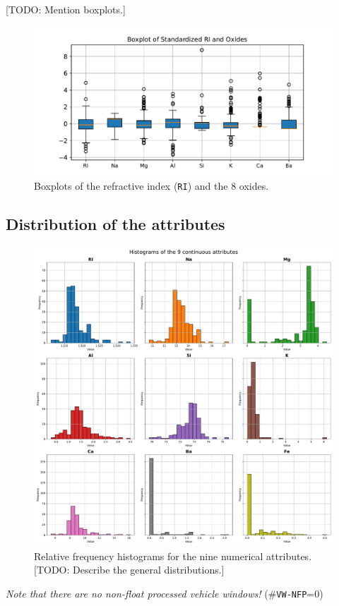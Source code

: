 \documentclass[dtu]{dtuarticle}
\newcommand{\todo}[1]{\color{red}[TODO: #1]\color{black}}
\begin{document}
	\todo{Mention boxplots.}

	\begin{figure}
		\centering
		\includegraphics[width=.8\textwidth]{figures/boxplots}
		\caption{Boxplots of the refractive index (\texttt{RI}) and the 8 oxides.}
		\label{fig:boxplots}
	\end{figure}

	\subsection{Distribution of the attributes}

	\label{section:distribution}

	\begin{figure}
		\centering
		\includegraphics[width=.8\textwidth]{figures/histograms}
		\caption{Relative frequency histograms for the nine numerical attributes. \todo{Describe the general distributions.}}
		\label{fig:histograms}
	\end{figure}

	\textit{Note that there are no non-float processed vehicle windows!} (\#\texttt{VW-NFP}=0)
\end{document}
